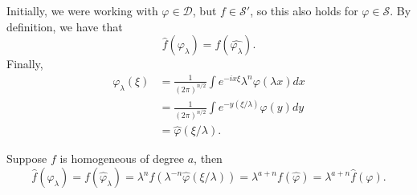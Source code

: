 \documentclass[11pt]{scrartcl}
\renewcommand{\hat}{\widehat}
\let \phi \varphi
\begin{document}
Initially, we were working with $\phi \in \mathcal D$, but $f \in \mathcal S'$, so this also holds for $\phi \in \mathcal S$.  
By definition, we have that
$$\hat{f}(\phi_\lambda) = f(\hat{\phi_\lambda}).$$
Finally,
\begin{align*}
\hat{\phi_\lambda}(\xi) &= \frac{1}{(2\pi)^{n/2}}\int e^{-ix\xi} \lambda^n \phi(\lambda x)dx \\
&=\frac{1}{(2\pi)^{n/2}} \int e^{-y(\xi/\lambda)}\phi(y)dy \\
&= \hat{\phi}(\xi/\lambda).
\end{align*}

Suppose $f$ is homogeneous of degree $a$, then
$$\hat{f}(\phi_\lambda) = f(\hat{\phi}_\lambda) = \lambda^nf(\lambda^{-n}\hat{\phi}(\xi/\lambda)) = \lambda^{a+n}f(\hat{\phi}) = \lambda^{a+n} \hat{f}(\phi).$$
\end{document}
